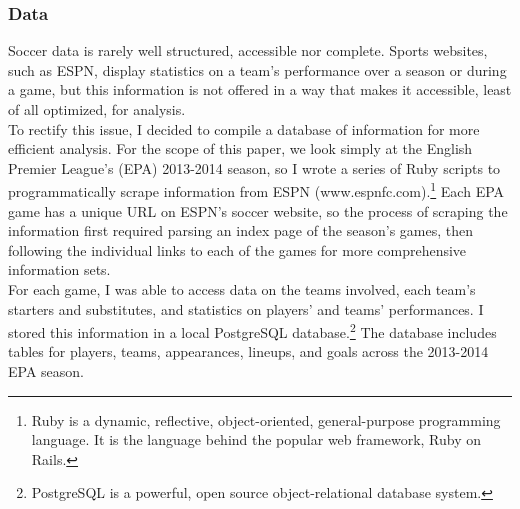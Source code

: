 \documentclass[a4paper,10pt]{article}
\newcommand{\br}{\\[10pt]}
\begin{document}
  \subsubsection*{Data}
  Soccer data is rarely well structured, accessible nor complete. Sports websites, such as ESPN,  display statistics on a team's performance over a season or during a game, but this information is not offered in a way that makes it accessible, least of all optimized, for analysis.
  \br
  To rectify this issue, I decided to compile a database of information for more efficient analysis. For the scope of this paper, we look simply at the English Premier League's (EPA) 2013-2014 season, so I wrote a series of Ruby scripts to programmatically scrape information from ESPN (www.espnfc.com).\footnote{Ruby is a dynamic, reflective, object-oriented, general-purpose programming language. It is the language behind the popular web framework, Ruby on Rails.} Each EPA game has a unique URL on ESPN's soccer website, so the process of scraping the information first required parsing an index page of the season's games, then following the individual links to each of the games for more comprehensive information sets. 
  \br
  For each game, I was able to access data on the teams involved, each team's starters and substitutes, and statistics on players' and teams' performances. I stored this information in a local PostgreSQL database.\footnote{PostgreSQL is a powerful, open source object-relational database system.} The database includes tables for players, teams, appearances, lineups, and goals across the 2013-2014 EPA season.
    
\end{document}
